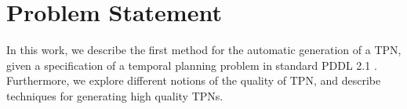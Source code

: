 \section{Problem Statement}
\label{intro: Problem Statement}

In this work, we describe the first method for the automatic generation of a TPN, given a specification of a temporal planning problem in standard PDDL 2.1 \cite{fox2003pddl2}. 
Furthermore, we explore different notions of the quality of TPN, and describe techniques for generating high quality TPNs.



